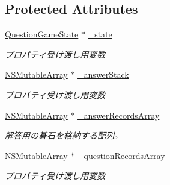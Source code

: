 \subsection*{Protected Attributes}
\begin{DoxyCompactItemize}
\item 
\hypertarget{interface_question_games_abf9b19a19179cb4d061d6ecbbcee456b}{
\hyperlink{interface_question_game_state}{QuestionGameState} $\ast$ \hyperlink{interface_question_games_abf9b19a19179cb4d061d6ecbbcee456b}{\_\-state}}
\label{interface_question_games_abf9b19a19179cb4d061d6ecbbcee456b}

\begin{DoxyCompactList}\small\item\em プロパティ受け渡し用変数 \end{DoxyCompactList}\item 
\hypertarget{interface_question_games_a6506ceada180d02f435d5d40aee57514}{
\hyperlink{class_n_s_mutable_array}{NSMutableArray} $\ast$ \hyperlink{interface_question_games_a6506ceada180d02f435d5d40aee57514}{\_\-answerStack}}
\label{interface_question_games_a6506ceada180d02f435d5d40aee57514}

\begin{DoxyCompactList}\small\item\em プロパティ受け渡し用変数 \end{DoxyCompactList}\item 
\hypertarget{interface_question_games_a4cf52e5fe2989f5b06be2fa268d5cfde}{
\hyperlink{class_n_s_mutable_array}{NSMutableArray} $\ast$ \hyperlink{interface_question_games_a4cf52e5fe2989f5b06be2fa268d5cfde}{\_\-answerRecordsArray}}
\label{interface_question_games_a4cf52e5fe2989f5b06be2fa268d5cfde}

\begin{DoxyCompactList}\small\item\em 解答用の碁石を格納する配列。 \end{DoxyCompactList}\item 
\hypertarget{interface_question_games_ae62d0566f3509043d51de8d8889e13d6}{
\hyperlink{class_n_s_mutable_array}{NSMutableArray} $\ast$ \hyperlink{interface_question_games_ae62d0566f3509043d51de8d8889e13d6}{\_\-questionRecordsArray}}
\label{interface_question_games_ae62d0566f3509043d51de8d8889e13d6}

\begin{DoxyCompactList}\small\item\em プロパティ受け渡し用変数 \end{DoxyCompactList}\end{DoxyCompactItemize}
